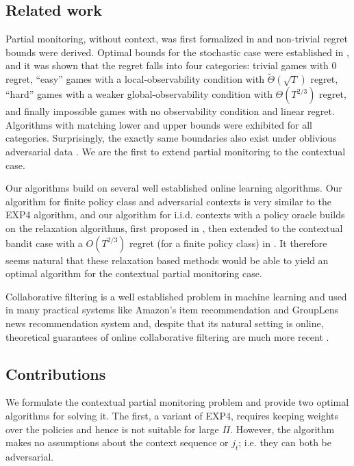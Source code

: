 \documentclass[11pt]{article}
\begin{document}
\subsection{Related work }
Partial monitoring, without context, was first formalized in \cite{piccolboni2001discrete} and non-trivial regret bounds were derived. Optimal bounds for the stochastic case were established in \cite{bartok2011minimax}, and it was shown that the regret falls into four categories: trivial games with 0 regret, ``easy'' games with a local-observability condition with $\tilde\Theta(\sqrt{T})$ regret, ``hard'' games with a weaker global-observability condition with $\Theta(T^{2/3})$ regret, and finally impossible games with no observability condition and linear regret. Algorithms with matching lower and upper bounds were exhibited for all categories. Surprisingly, the exactly same boundaries also exist under oblivious adversarial data \cite{foster2012no}. We are the first to extend partial monitoring to the contextual case.

Our algorithms build on several well established online learning algorithms. Our algorithm for finite policy class and adversarial contexts is very similar to the \textsc{EXP4} \cite{auer2002exp4} algorithm, and our algorithm for i.i.d. contexts with a policy oracle builds on the relaxation algorithms, first proposed in \cite{rakhlinrelax}, then extended to the contextual bandit case with a $O(T^{2/3})$ regret (for a finite policy class) in \cite{rakhlin2016bistro,syrgkanis2016improved}. It therefore seems natural that these relaxation based methods would be able to yield an optimal algorithm for the contextual partial monitoring case. 

Collaborative filtering is a well established problem in machine learning and used in many practical systems like Amazon's item recommendation \cite{linden2003amazon} and GroupLens news recommendation system \cite{resnick1994grouplens} and, despite that its natural setting is online, theoretical guarantees of online collaborative filtering are much more recent \cite{bresler2014latent,bresler2016collaborative}. 

\subsection{Contributions}
We formulate the contextual partial monitoring problem and provide two optimal algorithms for solving it. The first, a variant of \textsc{EXP4}\cite{auer2002exp4}, requires keeping weights over the policies and hence is not suitable for large $\Pi$. However, the algorithm makes no assumptions about the context sequence or $j_t$; i.e. they can both be adversarial.
\end{document}
